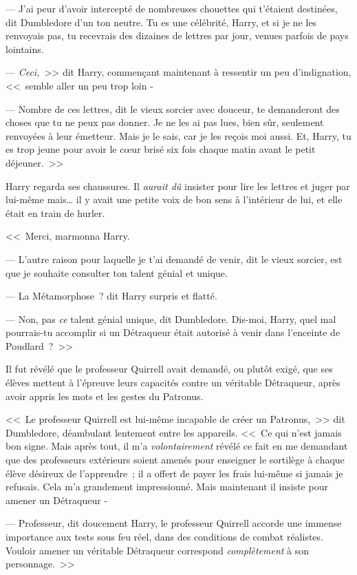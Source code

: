 --- J'ai peur d'avoir intercepté de nombreuses chouettes qui t'étaient destinées, dit Dumbledore d'un ton neutre. Tu es une célébrité, Harry, et si je ne les renvoyais pas, tu recevrais des dizaines de lettres par jour, venues parfois de pays lointains.

--- \emph{Ceci,}~>> dit Harry, commençant maintenant à ressentir un peu d'indignation, <<~semble aller un peu trop loin -

--- Nombre de ces lettres, dit le vieux sorcier avec douceur, te demanderont des choses que tu ne peux pas donner. Je ne les ai pas lues, bien sûr, seulement renvoyées à leur émetteur. Mais je le sais, car je les reçois moi aussi. Et, Harry, tu es trop jeune pour avoir le cœur brisé six fois chaque matin avant le petit déjeuner.~>>

Harry regarda ses chaussures. Il \emph{aurait dû} insister pour lire les lettres et juger par lui-même mais… il y avait une petite voix de bon sens à l'intérieur de lui, et elle était en train de hurler.

<<~Merci, marmonna Harry.

--- L'autre raison pour laquelle je t'ai demandé de venir, dit le vieux sorcier, est que je souhaite consulter ton talent génial et unique.

--- La Métamorphose~? dit Harry surpris et flatté.

--- Non, pas \emph{ce} talent génial unique, dit Dumbledore. Dis-moi, Harry, quel mal pourrais-tu accomplir si un Détraqueur était autorisé à venir dans l'enceinte de Poudlard~?~>>

\later

Il fut révélé que le professeur Quirrell avait demandé, ou plutôt exigé, que ses élèves mettent à l'épreuve leurs capacités contre un véritable Détraqueur, après avoir appris les mots et les gestes du Patronus.

<<~Le professeur Quirrell est lui-même incapable de créer un Patronus,~>> dit Dumbledore, déambulant lentement entre les appareils. <<~Ce qui n'est jamais bon signe. Mais après tout, il m'a \emph{volontairement} révélé ce fait en me demandant que des professeurs extérieurs soient amenés pour enseigner le sortilège à chaque élève désireux de l'apprendre~; il a offert de payer les frais lui-même si jamais je refusais. Cela m'a grandement impressionné. Mais maintenant il insiste pour amener un Détraqueur -

--- Professeur, dit doucement Harry, le professeur Quirrell accorde une immense importance aux tests sous feu réel, dans des conditions de combat réalistes. Vouloir amener un véritable Détraqueur correspond \emph{complètement} à son personnage.~>>

